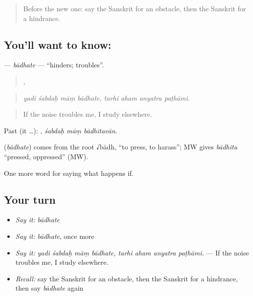 \label{lesson:SA-C372-badhate}



\begin{quote}
Before the new one: say the Sanskrit for an obstacle, then the Sanskrit for a hindrance.
\end{quote}

\subsection*{You'll want to know: }
\textbf{} — \emph{bādhate} — \textquotedblleft{}hinders; troubles\textquotedblright{}.

\begin{quote}
   ,    
\end{quote}

\begin{quote}
\emph{yadi śabdaḥ māṃ bādhate, tarhi aham anyatra paṭhāmi.}
\end{quote}

\begin{quote}
If the noise troubles me, I study elsewhere.
\end{quote}

Past (it …):   , \emph{śabdaḥ māṃ bādhitavān}.

\begin{cousinweb}
\textbf{} (\emph{bādhate}) comes from the root √bādh, \textquotedblleft{}to press, to harass\textquotedblright{}; MW gives \emph{bādhita} \textquotedblleft{}pressed, oppressed\textquotedblright{} (MW).
\end{cousinweb}

\begin{grammarlens}[title={What you've built}]
One more word for saying what happens if.
\end{grammarlens}

\subsection*{Your turn}
\begin{itemize}
\raggedright
  \item \emph{Say it:} \emph{bādhate}
  \item \emph{Say it:} \emph{bādhate}, once more
  \item \emph{Say it:} \emph{yadi śabdaḥ māṃ bādhate, tarhi aham anyatra paṭhāmi.} — If the noise troubles me, I study elsewhere.
  \item \emph{Recall:} say the Sanskrit for an obstacle, then the Sanskrit for a hindrance, then say \emph{bādhate} again
\end{itemize}

